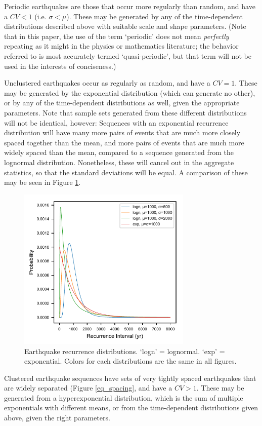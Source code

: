 \documentclass[se]{copernicus}
\begin{document}
Periodic earthquakes are those that occur more regularly than random,
and have a \(CV < 1\) (i.e. \(\sigma < \mu\)). These may be generated
by any of the time-dependent distributions described above with suitable
scale and shape parameters. (Note that in this paper, the use of the
term `periodic' does not mean \emph{perfectly} repeating as it might in
the physics or mathematics literature; the behavior referred to is most 
accurately termed `quasi-periodic', but that term will not be used in the 
interests of conciseness.)

Unclustered earthquakes occur as regularly as random, and have a
\(CV=1\). These may be generated by the exponential distribution (which
can generate no other), or by any of the time-dependent distributions as
well, given the appropriate parameters. Note that sample sets generated
from these different distributions will not be identical, however:
Sequences with an exponential recurrence distribution will have many
more pairs of events that are much more closely spaced together than the
mean, and more pairs of events that are much more widely spaced than the
mean, compared to a sequence generated from the lognormal distribution.
Nonetheless, these will cancel out in the aggregate statistics, so that
the standard deviations will be equal. A comparison of these may be seen
in Figure \ref{eq_rec_dists}.


\begin{figure}[t]
\includegraphics[width=8.3cm]{./figures/recurrence_dists.pdf}
\caption{Earthquake recurrence distributions. `logn' = lognormal. `exp' = 
  exponential. Colors for each distributions are the same in all figures. 
  \label{eq_rec_dists}}
\end{figure}

Clustered earthquake sequences have sets of very tightly spaced earthquakes
that are widely separated (Figure \ref{eq_spacing}, and have a \(CV>1\). These
may be generated from a hyperexponential distribution, which is the sum of
multiple exponentials with different means, or from the time-dependent
distributions given above, given the right parameters.
\end{document}
